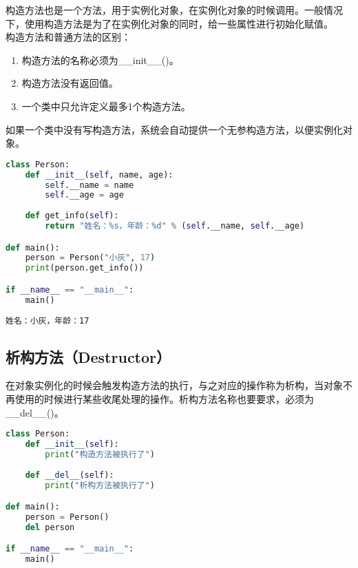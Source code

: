 构造方法也是一个方法，用于实例化对象，在实例化对象的时候调用。一般情况下，使用构造方法是为了在实例化对象的同时，给一些属性进行初始化赋值。\\

构造方法和普通方法的区别：

\begin{enumerate}
	\item 构造方法的名称必须为\_\_init\_\_()。
	\item 构造方法没有返回值。
	\item 一个类中只允许定义最多1个构造方法。
\end{enumerate}

如果一个类中没有写构造方法，系统会自动提供一个无参构造方法，以便实例化对象。\\


\begin{lstlisting}[language=Python]
class Person:
    def __init__(self, name, age):
        self.__name = name
        self.__age = age
    
    def get_info(self):
        return "姓名：%s，年龄：%d" % (self.__name, self.__age)

def main():
    person = Person("小灰", 17)
    print(person.get_info())

if __name__ == "__main__":
    main()
\end{lstlisting}

\begin{tcolorbox}
	\begin{verbatim}
姓名：小灰，年龄：17
\end{verbatim}
\end{tcolorbox}

\vspace{0.5cm}

\subsection{析构方法（Destructor）}

在对象实例化的时候会触发构造方法的执行，与之对应的操作称为析构，当对象不再使用的时候进行某些收尾处理的操作。析构方法名称也要要求，必须为\_\_del\_\_()。\\


\begin{lstlisting}[language=Python]
class Person:
    def __init__(self):
        print("构造方法被执行了")
    
    def __del__(self):
        print("析构方法被执行了")

def main():
    person = Person()
    del person

if __name__ == "__main__":
    main()
\end{lstlisting}

